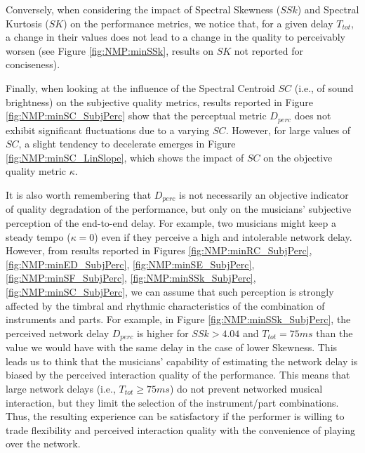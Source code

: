 Conversely, when considering the impact of Spectral Skewness ($SSk$) and Spectral Kurtosis ($SK$) on the performance metrics, we notice that, for a given delay $T_{tot}$, a change in their values does not lead to a change in the quality to perceivably worsen (see Figure \ref{fig:NMP:minSSk}, results on $SK$ not reported for conciseness). 

Finally, when looking at the influence of the Spectral Centroid $SC$ (i.e., of sound brightness) on the subjective quality metrics, results reported in Figure \ref{fig:NMP:minSC_SubjPerc} show that the perceptual metric $D_{perc}$ does not exhibit significant fluctuations due to a varying $SC$. However, for large values of $SC$, a slight tendency to decelerate emerges in Figure \ref{fig:NMP:minSC_LinSlope}, which shows the impact of $SC$ on the objective quality metric $\kappa$.

It is also worth remembering that $D_{perc}$ is not necessarily an objective indicator of quality degradation of the performance, but only on the musicians' subjective perception of the end-to-end delay. For example, two musicians might keep a steady tempo ($\kappa=0$) even if they perceive a high and intolerable network delay. However, from results reported in Figures \ref{fig:NMP:minRC_SubjPerc}, \ref{fig:NMP:minED_SubjPerc}, \ref{fig:NMP:minSE_SubjPerc}, \ref{fig:NMP:minSF_SubjPerc}, \ref{fig:NMP:minSSk_SubjPerc}, \ref{fig:NMP:minSC_SubjPerc}, we can assume that such perception is strongly affected by the timbral and rhythmic characteristics of the combination of instruments and parts. For example, in Figure \ref{fig:NMP:minSSk_SubjPerc}, the perceived network delay $D_{perc}$ is higher for $SSk>4.04$ and $T_{tot}=75 ms$ than the value we would have with the same delay in the case of lower Skewness. This leads us to think that the musicians' capability of estimating the network delay is biased by the perceived interaction quality of the performance. 
This means that large network delays (i.e., $T_{tot}\geq 75ms$) do not prevent networked musical interaction, but they limit the selection of the instrument/part combinations. Thus, the resulting experience can be satisfactory if the performer is willing to trade flexibility and perceived interaction quality with the convenience of playing over the network.

